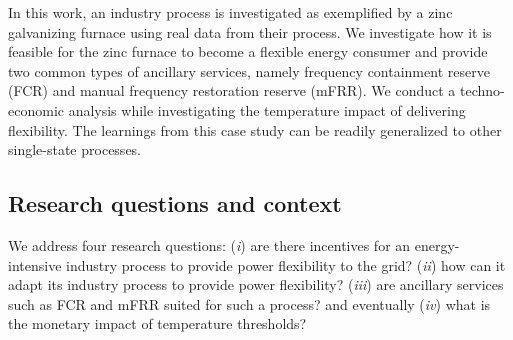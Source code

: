 \documentclass[conference]{IEEEtran}
\begin{document}

In this work, an industry process is investigated as exemplified by a zinc galvanizing furnace using real data from their process. We investigate how it is feasible for the zinc furnace to become a flexible energy consumer and provide two common types of ancillary services, namely frequency containment reserve (FCR) and manual frequency restoration reserve (mFRR). We conduct a techno-economic analysis while investigating the temperature impact of delivering flexibility.  The learnings from this case study can be readily generalized to other single-state processes.

\vspace{0mm}
\subsection{Research questions and context}
\vspace{-1mm}
We address four research questions: (\textit{i}) are there incentives for an energy-intensive industry process to provide power flexibility to the grid? (\textit{ii}) how can it adapt its industry process to provide power flexibility? (\textit{iii}) are ancillary services such as FCR and mFRR suited for such a process? and eventually (\textit{iv})  what is the monetary impact of temperature thresholds?

\end{document}

